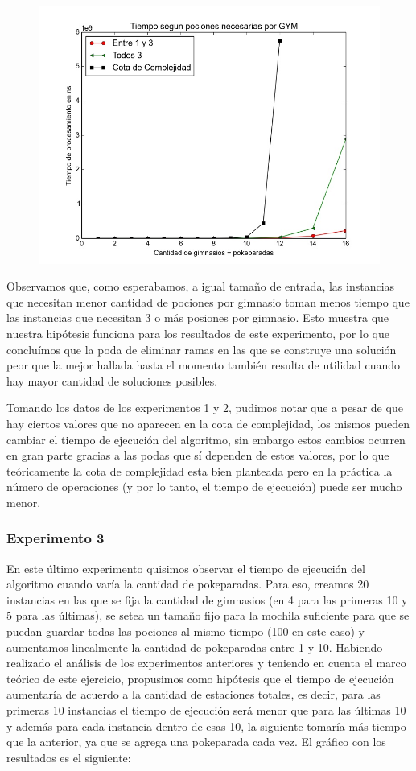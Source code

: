  \begin{figure}[H]
      \begin{center}
        \includegraphics[width=0.7\columnwidth]{imagenes/exp2_ej1.jpeg}
        \caption{}
      \end{center}
  \end{figure}

      Observamos que, como esperabamos, a igual tamaño de entrada, las instancias que necesitan menor cantidad de pociones por gimnasio toman menos tiempo que las instancias que necesitan 3 o más posiones por gimnasio. Esto muestra que nuestra hipótesis funciona para los resultados de este experimento, por lo que concluímos que la poda de eliminar ramas en las que se construye una solución peor que la mejor hallada hasta el momento también resulta de utilidad cuando hay mayor cantidad de soluciones posibles. 

      Tomando los datos de los experimentos 1 y 2, pudimos notar que a pesar de que hay ciertos valores que no aparecen en la cota de complejidad, los mismos pueden cambiar el tiempo de ejecución del algoritmo, sin embargo estos cambios ocurren en gran parte gracias a las podas que sí dependen de estos valores, por lo que teóricamente la cota de complejidad esta bien planteada pero en la práctica la número de operaciones (y por lo tanto, el tiempo de ejecución) puede ser mucho menor.

    \subsubsection{Experimento 3}

      En este último experimento quisimos observar el tiempo de ejecución del algoritmo cuando varía la cantidad de pokeparadas. Para eso, creamos 20 instancias en las que se fija la cantidad de gimnasios (en 4 para las primeras 10 y 5 para las últimas), se setea un tamaño fijo para la mochila suficiente para que se puedan guardar todas las pociones al mismo tiempo  (100 en este caso) y aumentamos linealmente la cantidad de pokeparadas entre 1 y 10.
      Habiendo realizado el análisis de los experimentos anteriores y teniendo en cuenta el marco teórico de este ejercicio, propusimos como hipótesis que el tiempo de ejecución aumentaría de acuerdo a la cantidad de estaciones totales, es decir, para las primeras 10 instancias el tiempo de ejecución será menor que para las últimas 10 y además para cada instancia dentro de esas 10, la siguiente tomaría más tiempo que la anterior, ya que se agrega una pokeparada cada vez.
      El gráfico con los resultados es el siguiente:

